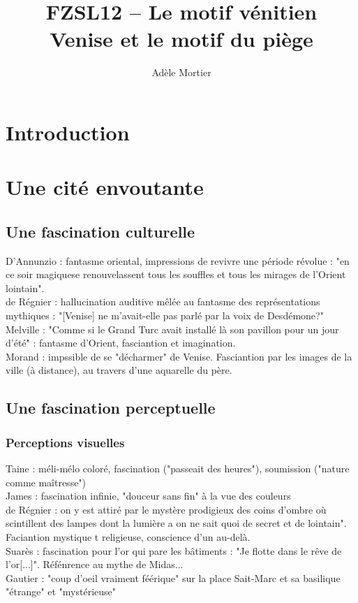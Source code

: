 \documentclass[a4paper,10pt]{article}
\title{FZSL12 -- Le motif vénitien\\
	Venise et le motif du piège}
\author{Adèle Mortier}
\begin{document}
\maketitle
\nocite{*}

\section*{Introduction}
\section{Une cité envoutante}
	\subsection{Une fascination culturelle}
	D'Annunzio \cite{DAnnunzio1899} : fantasme oriental, impressions de revivre une période révolue : "en ce soir magiquese renouvelassent tous les souffles et tous les mirages de l'Orient lointain".\\
	de Régnier \cite{Regnier1906} : hallucination auditive mêlée au fantasme des représentations mythiques : "[Venise] ne m'avait-elle pas parlé par la voix de Desdémone?"\\
	Melville \cite{Melville1856} : "Comme si le Grand Turc avait installé là son pavillon pour un jour d'été" : fantasme d'Orient, fasciantion et imagination.\\
	Morand \cite{Morand1971} : impssible de se "décharmer" de Venise. Fasciantion par les images de la ville (à distance), au travers d'une aquarelle du père.\\
	\subsection{Une fascination perceptuelle}
		\subsubsection{Perceptions visuelles}
			Taine \cite{Taine1866} : méli-mélo coloré, fascination ("passeait des heures"), soumission ("nature comme maîtresse")\\
			James \cite{James1909} : fascination infinie, "douceur sans fin" à la vue des couleurs \\
			de Régnier \cite{Regnier1924} : on y est attiré par le mystère prodigieux des coins d'ombre où scintillent des lampes dont la lumière a on ne sait quoi de secret et de lointain". Faciantion mystique t religieuse, conscience d'un au-delà.\\
			Suarès \cite{Suares1910} : fascination pour l'or qui pare les bâtiments : "Je flotte dans le rêve de l'or[...]". Réfénrence au mythe de Midas...\\
			Gautier \cite{Gautier1852} : "coup d'oeil vraiment féérique" sur la place Sait-Marc et sa basilique "étrange" et "mystérieuse"\\
\end{document}
